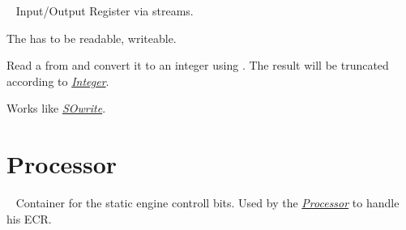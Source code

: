 \documentclass[letterpaper,10pt,english]{sphinxmanual}
\begin{document}
\begin{fulllineitems}
\label{core:py_register_machine2.core.register.StreamIORegister}~\label{core:streamioregister}
Input/Output Register via streams.

The  has to be readable,  writeable.

\begin{fulllineitems}
\label{core:py_register_machine2.core.register.StreamIORegister.read}
Read a  from  and convert it to an integer
using . The result will be truncated according to {\hyperref[core:integer]{\emph{Integer}}}.

\end{fulllineitems}


\begin{fulllineitems}
\label{core:py_register_machine2.core.register.StreamIORegister.write}
Works like {\hyperref[core:sowrite]{\emph{SOwrite}}}.

\end{fulllineitems}


\end{fulllineitems}



\section{Processor}
\label{core:module-py_register_machine2.core.processor}\label{core:processor}

\begin{fulllineitems}
\label{core:py_register_machine2.core.processor.EnigneControlBits}~\label{core:enignecontrolbits}
Container for the static engine controll bits.
Used by the {\hyperref[core:id2]{\emph{Processor}}} to handle his ECR.

\end{fulllineitems}
\end{document}
